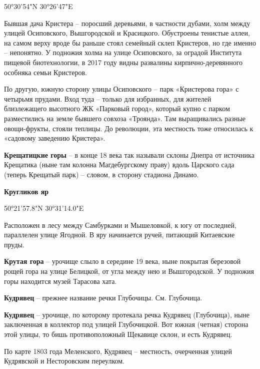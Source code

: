 50°30'54"N 30°26'47"E

Бывшая дача Кристера – поросший деревьями, в частности дубами, холм между улицей Осиповского, Вышгородской и Красицкого. Обустроены тенистые аллеи, на самом верху вроде бы раньше стоял семейный склеп Кристеров, но где именно – непонятно. У подножия холма на улице Осиповского, за оградой Института пищевой биотехнологии, в 2017 году видны развалины кирпично-деревянного особняка семьи Кристеров.

По другую, южную сторону улицы Осиповского – парк «Кристерова гора» с четырьмя прудами. Вход туда – только для избранных, для жителей близлежащего высотного ЖК «Парковый город», который купно с парком разместились на земле бывшего совхоза «Троянда». Там выращивались разные овощи-фрукты, стояли теплицы. До революции, эта местность тоже относилась к «садовому заведению Кристера».\\


\medskip

\textbf{Крещатицкие горы} – в конце 18 века так называли склоны Днепра от источника Крещатика (ныне там колонна Магдебургскому праву) вдоль Царского сада (теперь Крещатый парк) – словом, в сторону стадиона Динамо.\\

\medskip

\textbf{Кругликов яр} 

50°21'57.8"N 30°31'14.0"E

Расположен в лесу между Самбурками и Мышеловкой, к югу от последней, параллелен улице Ягодной. В яру начинается ручей, питающий Китаевские пруды.\\

\medskip

\textbf{Крутая гора} – урочище слыло в середине 19 века, ныне покрытая березовой рощей гора на улице Белицкой, от угла между нею и Вышгородской. У подножия горы находится музей Тарасова хата.\\

\medskip

\textbf{Кудрявец} – прежнее название речки Глубочицы. См. Глубочица.\\


\medskip

\textbf{Кудрявец} – урочище, по которому протекала речка Кудрявец (Глубочица), ныне заключенная в коллектор под улицей Глубочицкой. Вот южная (четная) сторона этой улицы, то бишь противоположный Щекавице склон, и есть Кудрявец.

По карте 1803 года Меленского, Кудрявец – местность, очерченная улицей Кудрявской и Несторовским переулком.

